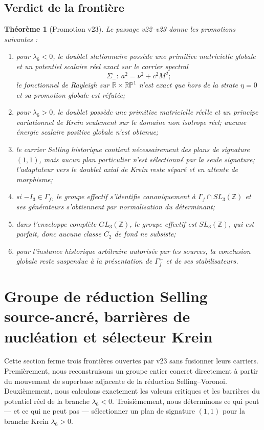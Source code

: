 \documentclass[11pt,a4paper]{article}
\newtheorem{theorem}{Théorème}[section]
\newcommand{\Z}{\mathbb Z}
\begin{document}
\subsection{Verdict de la frontière}

\begin{theorem}[Promotion v23]\label{thm:v23-verdict}
Le passage v22--v23 donne les promotions suivantes :
\begin{enumerate}[label=\textup{(\roman*)}]
\item pour $\lambda_6<0$, le doublet stationnaire possède une primitive matricielle globale et un potentiel scalaire réel exact sur le carrier spectral
\[
 \Sigma_-:\ a^2=\nu^2+c^2M^2;
\]
le fonctionnel de Rayleigh sur $\mathbb R\times\mathbb{RP}^1$ n'est exact que hors de la strate $\eta=0$ et sa promotion globale est réfutée;
\item pour $\lambda_6>0$, le doublet possède une primitive matricielle réelle et un principe variationnel de Krein seulement sur le domaine non isotrope réel; aucune énergie scalaire positive globale n'est obtenue;
\item le carrier Selling historique contient nécessairement des plans de signature $(1,1)$, mais aucun plan particulier n'est sélectionné par la seule signature; l'adaptateur vers le doublet axial de Krein reste séparé et en attente de morphisme;
\item si $-I_3\in\Gamma_f$, le groupe effectif s'identifie canoniquement à $\Gamma_f\cap SL_3(\Z)$ et ses générateurs s'obtiennent par normalisation du déterminant;
\item dans l'enveloppe complète $GL_3(\Z)$, le groupe effectif est $SL_3(\Z)$, qui est parfait, donc aucune classe $C_2$ de fond ne subsiste;
\item pour l'instance historique arbitraire autorisée par les sources, la conclusion globale reste suspendue à la présentation de $\Gamma_f^+$ et de ses stabilisateurs.
\end{enumerate}
\end{theorem}


\section{Groupe de réduction Selling source-ancré, barrières de nucléation et sélecteur Krein}\label{sec:v24-historical-selling-barriers-krein}

Cette section ferme trois frontières ouvertes par v23 sans fusionner leurs carriers. Premièrement, nous reconstruisons un groupe entier concret directement à partir du mouvement de superbase adjacente de la réduction Selling--Voronoi. Deuxièmement, nous calculons exactement les valeurs critiques et les barrières du potentiel réel de la branche $\lambda_6<0$. Troisièmement, nous déterminons ce qui peut --- et ce qui ne peut pas --- sélectionner un plan de signature $(1,1)$ pour la branche Krein $\lambda_6>0$.
\end{document}
